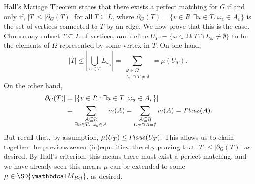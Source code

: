 \begin{lproof}
    Hall's Mariage Theorem states that there exists a perfect matching
    for $G$ if and only if, $|T| \le  |\partial_G(T)|$ for all $T \subseteq L$,
    where $\partial_G(T) = \{ v \in R : \exists u \in T.~\omega_u \in A_v\}$ is the set of vertices connected to $T$ by an edge. 
    We now prove that this is the case.
    Choose any subset $T \subseteq L$ of vertices, and define $U_T := \{ \omega \in \Omega : T \cap L_\omega \ne \emptyset \}$ to be the elements of $\Omega$ represented by some vertex in $T$. 
    On one hand,
    \[ 
        |T| \le | \bigcup_{u \in T} L_{\omega_u} | 
            =  \sum_{\substack{\omega \in \Omega \\ L_\omega \cap T \ne\emptyset }}
            = \mu(U_T).
    \]
    On the other hand, 
    \begin{align*}
        |\partial_G(T)] &=  |\{ v \in R : \exists u \in T.~\omega_u \in A_v \}| \\
            &= \sum_{\substack{A \subseteq \Omega \\ \exists u \in T.~ \omega_u \in A}} m(A)
            = \sum_{\substack{A \subseteq \Omega \\ U_T \cap A = \emptyset}} m(A)
            = \mathit{Plaus}(A).  
    \end{align*}
    But recall that, by assumption, $\mu(U_T) \le \mathit{Plaus}(U_T)$. 
    This allows us to 
    chain together the previous seven (in)equalities, thereby proving that $|T| \le |\partial_G(T)|$ as desired.
    By Hall's criterion, this means there must exist a perfect matching, and we have already seen this means $\mu$ can be extended to some $\bar\mu \in \SD{\dg M_{\Bel}}$, as desired.

\end{lproof}
